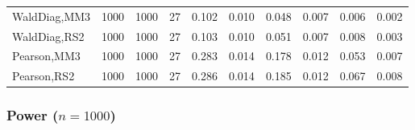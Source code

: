 \documentclass[
]{article}
\begin{document}
\begin{table}[H]
{\begin{tabular}[t]{lrrrrrrlrr}
\hspace{1em}WaldDiag,MM3 & 1000 & 1000 & 27 & 0.102 & 0.010 & 0.048 & 0.007 & 0.006 & 0.002\\
\hspace{1em}WaldDiag,RS2 & 1000 & 1000 & 27 & 0.103 & 0.010 & 0.051 & 0.007 & 0.008 & 0.003\\
\hspace{1em}Pearson,MM3 & 1000 & 1000 & 27 & 0.283 & 0.014 & 0.178 & 0.012 & 0.053 & 0.007\\
\hspace{1em}Pearson,RS2 & 1000 & 1000 & 27 & 0.286 & 0.014 & 0.185 & 0.012 & 0.067 & 0.008\\
\bottomrule
\end{tabular}}
\endgroup{}
\end{table}

\hypertarget{power-n1000-3}{%
\subsubsection{\texorpdfstring{Power
(\(n=1000\))}{Power (n=1000)}}\label{power-n1000-3}}
\end{document}
